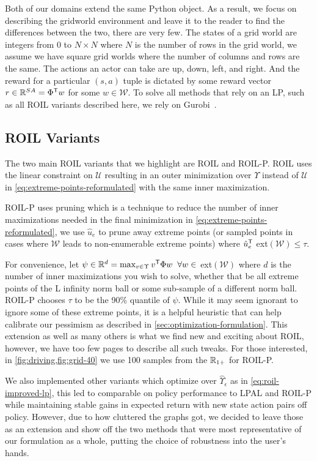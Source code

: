 \documentclass[10pt]{article}
\renewcommand{\cite}{\citep}
\theoremstyle{plain}
\theoremstyle{remark}
\begin{document}
Both of our domains extend the same Python object. As a result, we focus on describing the gridworld environment and leave it to the reader to find the differences between the two, there are very few. The states of a grid world are integers from 0 to $N\times N$ where $N$ is the number of rows in the grid world, we assume we have square grid worlds where the number of columns and rows are the same. The actions an actor can take are up, down, left, and right. And the reward for a particular $(s,a)$ tuple is dictated by some reward vector $r \in \mathbb{R}^{SA} = \Phi^{\mathsf{T}} w$ for some $w \in \mathcal{W}$. To solve all methods that rely on an LP, such as all ROIL variants described here, we rely on Gurobi~\cite{gurobi}.

\subsection{ROIL Variants}
\label{sec:roil_variants_appendix}
The two main ROIL variants that we highlight are ROIL and ROIL-P. ROIL uses the linear constraint on $\mathcal{U}$ resulting in an outer minimization over $\Upsilon$ instead of $\mathcal{U}$ in \eqref{eq:extreme-points-reformulated} with the same inner maximization. 

ROIL-P uses pruning which is a technique to reduce the number of inner maximizations needed in the final minimization in \eqref{eq:extreme-points-reformulated}, we use $\hat{u}_e$ to prune away extreme points (or sampled points in cases where $\mathcal{W}$ leads to non-enumerable extreme points) where $\hat{u}_e^{\mathsf{T}} $ ext$(\mathcal{W}) \leq \tau$. 

For convenience, let $\psi \in \mathbb{R}^d = \max_{v \in \Upsilon} v^{\mathsf{T}}\Phi w \;\; \forall w \in$ ext$(\mathcal{W})$ where $d$ is the number of inner maximizations you wish to solve, whether that be all extreme points of the L infinity norm ball or some sub-sample of a different norm ball. ROIL-P chooses $\tau$ to be the 90\% quantile of $\psi$. While it may seem ignorant to ignore some of these extreme points, it is a helpful heuristic that can help calibrate our pessimism as described in \cref{sec:optimization-formulation}. This extension as well as many others is what we find new and exciting about ROIL, however, we have too few pages to describe all such tweaks. For those interested, in \cref{fig:driving,fig:grid-40} we use 100 samples from the $\mathbb{R}_{1+}$ for ROIL-P.

We also implemented other variants which optimize over $\hat{\Upsilon}_\epsilon$ as in \eqref{eq:roil-improved-lp}, this led to comparable on policy performance to LPAL and ROIL-P while maintaining stable gains in expected return with new state action pairs off policy. However, due to how cluttered the graphs got, we decided to leave those as an extension and show off the two methods that were most representative of our formulation as a whole, putting the choice of robustness into the user's hands.
\end{document}
